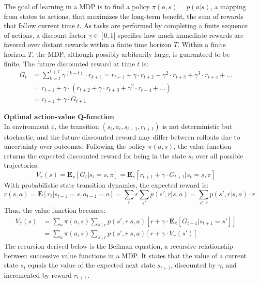 The goal of learning in a MDP is to find a policy $\pi(a,s) = p(a|s)$, a mapping from states to actions, that maximizes the long-term benefit, the sum of rewards that follow current time $t$.
As tasks are performed by completing a finite sequence of actions, a discount factor $\gamma \in \ ]0, 1[$ specifies how much immediate rewards are favored over distant rewards within a finite time horizon $T$. Within a finite horizon $T$, the MDP, although possibly arbitrarily large, is guaranteed to be finite. The future discounted reward at time $t$ is:
\[ 
\begin{split}
G_t &= \sum_{k=t}^{t+T} \gamma^{(k-t)} \cdot r_{k+1} = r_{t+1} + \gamma \cdot r_{t+2} + \gamma^2 \cdot r_{t+3} + \gamma^3 \cdot r_{t+4} + ... \\
&= r_{t+1} + \gamma \cdot (r_{t+2} + \gamma \cdot r_{t+3} + \gamma^2 \cdot r_{t+4} + ...) \\
&= r_{t+1} + \gamma \cdot G_{t+1}
\end{split}
\]

\textbf{Optimal action-value Q-function} \\
In environment $\varepsilon$, the transition $(s_t, a_t, s_{t+1}, r_{t+1})$ is not deterministic but stochastic, and the future discounted reward may differ between rollouts due to uncertainty over outcomes. Following the policy $\pi(a,s)$, the value function returns the expected discounted reward for being in the state $s_t$ over all possible trajectories:
\[ V_{\pi}(s) = \mathbf{E}_{\pi}[G_t|s_t=s,\pi] = \mathbf{E}_{\pi}[r_{t+1} + \gamma \cdot G_{t+1}|s_t=s,\pi] \]
With probabilistic state transition dynamics, the expected reward is: 
\[ r(s,a)=\mathbf{E}[r_t|s_{t-1}=s,a_{t-1}=a]=\sum_rr \sum_{s'}p(s',r|s,a) = \sum_{s',r}p(s',r|s,a) \cdot r \]
Thus, the value function becomes:
\[
\begin{split}
V_{\pi}(s) &= \sum_a\pi(a,s)\sum_{s',r}p(s',r|s,a)[r+\gamma \cdot \mathbf{E}_{\pi}[G_{t+1}|s_{t+1}=s']] \\
&= \sum_a\pi(a,s)\sum_{s',r}p(s',r|s,a)[r+\gamma \cdot V_{\pi}(s')]
\end{split}
\]
The recursion derived below is the Bellman equation, a recursive relationship between successive value functions in a MDP. It states that the value of a current state $s_t$ equals the value of the expected next state $s_{t+1}$, discounted by $\gamma$, and incremented by reward $r_{t+1}$.
\\

